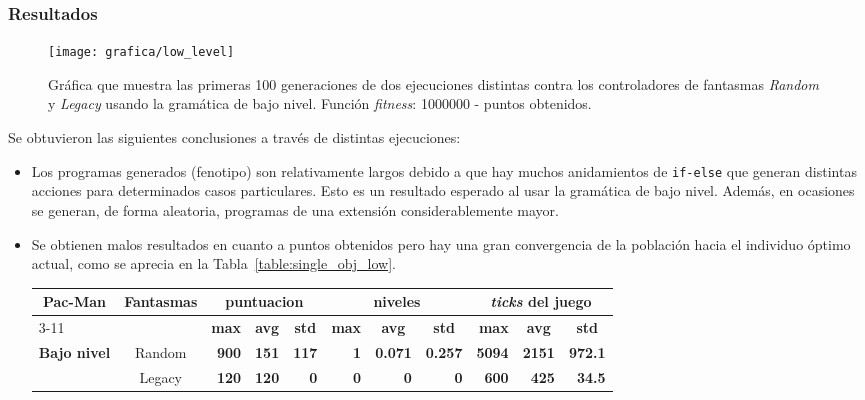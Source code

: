 \subsubsection{Resultados}
\begin{figure}[H]
\centering
\texttt{[image: grafica/low\_level]}
\caption{Gráfica que muestra las primeras 100 generaciones de dos ejecuciones distintas contra los controladores de fantasmas \textit{Random} y \textit{Legacy} usando la gramática de bajo nivel. Función \textit{fitness}: 1000000 - puntos obtenidos.}
\end{figure}

Se obtuvieron las siguientes conclusiones a través de distintas ejecuciones:
\begin{itemize}
\item Los programas generados (fenotipo) son relativamente largos debido a que hay muchos anidamientos de \texttt{if-else} que generan distintas acciones para determinados casos particulares. Esto es un resultado esperado al usar la gramática de bajo nivel. Además, en ocasiones se generan, de forma aleatoria, programas de una extensión considerablemente mayor.

\item Se obtienen malos resultados en cuanto a puntos obtenidos pero hay una gran convergencia de la población hacia el individuo óptimo actual, como se aprecia en la Tabla~\ref{table:single_obj_low}.

\begin{sidewaystable}[]
\centering
\begin{tabular}{|l|c|r|r|r|r|r|r|r|r|r|}
\hline
\multicolumn{1}{|c|}{\multirow{2}{*}{\textbf{Pac-Man}}} & \multirow{2}{*}{\textbf{Fantasmas}} & \multicolumn{3}{c|}{\textbf{puntuacion}} & \multicolumn{3}{c|}{\textbf{niveles}} & \multicolumn{3}{c|}{\textbf{\textit{ticks} del juego}} \\ \cline{3-11} 
\multicolumn{1}{|c|}{} &  & \textbf{max} & \multicolumn{1}{c|}{\textbf{avg}} & \multicolumn{1}{c|}{\textbf{std}} & \textbf{max} & \multicolumn{1}{c|}{\textbf{avg}} & \multicolumn{1}{c|}{\textbf{std}} & \textbf{max} & \multicolumn{1}{c|}{\textbf{avg}} & \multicolumn{1}{c|}{\textbf{std}} \\ \hline
\multirow{2}{*}{\textbf{Bajo nivel}} & Random & \multicolumn{1}{r|}{\textbf{900}} & \textbf{151} & \textbf{117} & \multicolumn{1}{r|}{\textbf{1}} & \textbf{0.071} & \textbf{0.257} & \multicolumn{1}{r|}{\textbf{5094}} & \textbf{2151} & \textbf{972.1} \\ \cline{2-11} 
 & Legacy & \multicolumn{1}{r|}{\textbf{120}} & \textbf{120} & \textbf{0} & \multicolumn{1}{r|}{\textbf{0}} & \textbf{0} & \textbf{0} & \multicolumn{1}{r|}{\textbf{600}} & \textbf{425} & \textbf{34.5} \\ \hline
\end{tabular}
\caption{Pac-Man de bajo nivel contra varios controladores de fantasmas. 1000 ejecuciones.}
\label{table:single_obj_low}
\end{sidewaystable}


\end{itemize}
